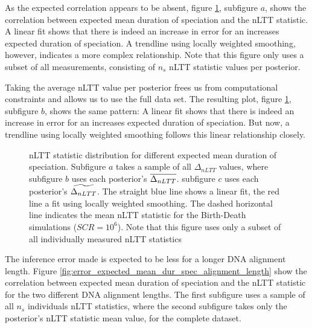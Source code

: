 As the expected correlation appears to be absent, figure 
\ref{fig:error_expected_mean_dur_spec}, subfigure $a$, 
shows the correlation between expected
mean duration of speciation and the nLTT statistic. A linear fit shows
that there is indeed an increase in error for an increases expected duration
of speciation. A trendline using locally weighted smoothing, however,
indicates a more complex relationship. Note that this figure only uses
a subset of all measurements, consisting of $n_s$ nLTT statistic values 
per posterior.

Taking the average nLTT value per posterior frees us from computational
constraints and allows us to use the full data set. The resulting
plot, figure \ref{fig:error_expected_mean_dur_spec}, subfigure $b$, shows the same pattern:
A linear fit shows
that there is indeed an increase in error for an increases expected duration
of speciation. But now, a trendline using locally weighted smoothing 
follows this linear relationship closely. 

\begin{figure}[!htbp]
  \caption{
    nLTT statistic distribution
    for different expected mean duration of speciation.
    Subfigure $a$ takes a sample of all $\Delta_{nLTT}$ values, where
    subfigure $b$ uses each posterior's $\overline{\Delta_{nLTT}}$.
    subfigure $c$ uses each posterior's $\widetilde{\Delta_{nLTT}}$.
    The straight blue line shows a linear
    fit, the red line a fit using locally weighted smoothing.
    The dashed horizontal line indicates
    the mean nLTT statistic for the Birth-Death simulations ($SCR = 10^6$).
    Note that this figure uses only a subset of all individually measured
    nLTT statistics
  }
  \label{fig:error_expected_mean_dur_spec}
\end{figure}

The inference error made is expected to be less for a longer DNA
alignment length. 
Figure \ref{fig:error_expected_mean_dur_spec_alignment_length} 
show the correlation between expected mean duration of speciation 
and the nLTT statistic for the two different DNA alignment lengths. 
The first subfigure uses a sample of all $n_s$ individuals nLTT statistics,
where the second subfigure takes only the posterior's 
nLTT statistic mean value, for the complete dataset.

